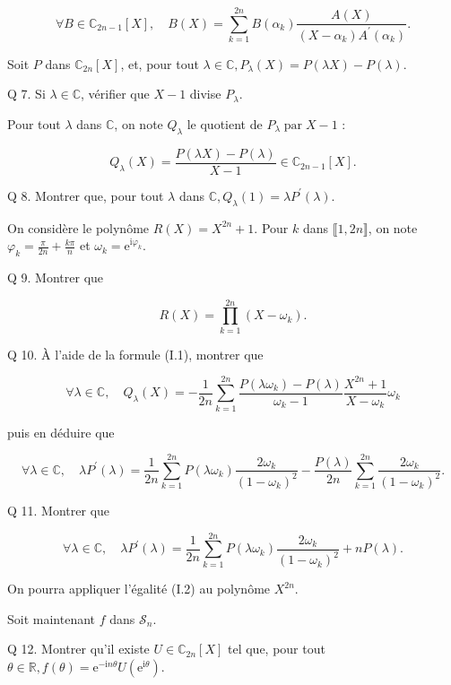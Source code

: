 \documentclass[10pt]{article}
\begin{document}
$$
\forall B \in \mathbb{C}_{2 n-1}[X], \quad B(X)=\sum_{k=1}^{2 n} B\left(\alpha_{k}\right) \frac{A(X)}{\left(X-\alpha_{k}\right) A^{\prime}\left(\alpha_{k}\right)} .
$$

Soit $P$ dans $\mathbb{C}_{2 n}[X]$, et, pour tout $\lambda \in \mathbb{C}, P_{\lambda}(X)=P(\lambda X)-P(\lambda)$.

Q 7. Si $\lambda \in \mathbb{C}$, vérifier que $X-1$ divise $P_{\lambda}$.

Pour tout $\lambda$ dans $\mathbb{C}$, on note $Q_{\lambda}$ le quotient de $P_{\lambda} \operatorname{par} X-1$ :

$$
Q_{\lambda}(X)=\frac{P(\lambda X)-P(\lambda)}{X-1} \in \mathbb{C}_{2 n-1}[X] .
$$

Q 8. Montrer que, pour tout $\lambda$ dans $\mathbb{C}, Q_{\lambda}(1)=\lambda P^{\prime}(\lambda)$.

On considère le polynôme $R(X)=X^{2 n}+1$. Pour $k$ dans $\llbracket 1,2 n \rrbracket$, on note $\varphi_{k}=\frac{\pi}{2 n}+\frac{k \pi}{n}$ et $\omega_{k}=\mathrm{e}^{\mathrm{i} \varphi_{k}}$.

Q 9. Montrer que

$$
R(X)=\prod_{k=1}^{2 n}\left(X-\omega_{k}\right) .
$$

Q 10. À l'aide de la formule (I.1), montrer que

$$
\forall \lambda \in \mathbb{C}, \quad Q_{\lambda}(X)=-\frac{1}{2 n} \sum_{k=1}^{2 n} \frac{P\left(\lambda \omega_{k}\right)-P(\lambda)}{\omega_{k}-1} \frac{X^{2 n}+1}{X-\omega_{k}} \omega_{k}
$$

puis en déduire que

$$
\forall \lambda \in \mathbb{C}, \quad \lambda P^{\prime}(\lambda)=\frac{1}{2 n} \sum_{k=1}^{2 n} P\left(\lambda \omega_{k}\right) \frac{2 \omega_{k}}{\left(1-\omega_{k}\right)^{2}}-\frac{P(\lambda)}{2 n} \sum_{k=1}^{2 n} \frac{2 \omega_{k}}{\left(1-\omega_{k}\right)^{2}} .
$$

Q 11. Montrer que

$$
\forall \lambda \in \mathbb{C}, \quad \lambda P^{\prime}(\lambda)=\frac{1}{2 n} \sum_{k=1}^{2 n} P\left(\lambda \omega_{k}\right) \frac{2 \omega_{k}}{\left(1-\omega_{k}\right)^{2}}+n P(\lambda) .
$$

On pourra appliquer l'égalité (I.2) au polynôme $X^{2 n}$.

Soit maintenant $f$ dans $\mathcal{S}_{n}$.

Q 12. Montrer qu'il existe $U \in \mathbb{C}_{2 n}[X]$ tel que, pour tout $\theta \in \mathbb{R}, f(\theta)=\mathrm{e}^{-\mathrm{i} n \theta} U\left(\mathrm{e}^{\mathrm{i} \theta}\right)$.
\end{document}
